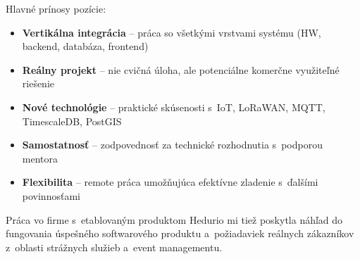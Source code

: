 Hlavné prínosy pozície:
\begin{itemize}
    \item \textbf{Vertikálna integrácia} -- práca so všetkými vrstvami systému (HW, backend, databáza, frontend)
    \item \textbf{Reálny projekt} -- nie cvičná úloha, ale potenciálne komerčne využiteľné riešenie
    \item \textbf{Nové technológie} -- praktické skúsenosti s~IoT, LoRaWAN, MQTT, TimescaleDB, PostGIS
    \item \textbf{Samostatnosť} -- zodpovednosť za technické rozhodnutia s~podporou mentora
    \item \textbf{Flexibilita} -- remote práca umožňujúca efektívne zladenie s~ďalšími povinnosťami
\end{itemize}

Práca vo firme s~etablovaným produktom Hedurio mi tiež poskytla náhľad do fungovania úspešného softwarového produktu a~požiadaviek reálnych zákazníkov z~oblasti strážnych služieb a~event managementu.

\endinput
